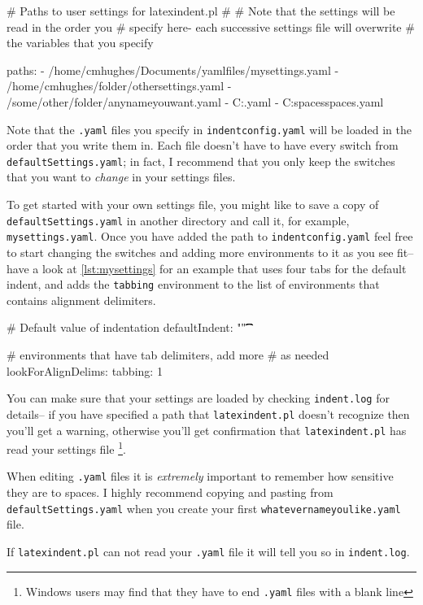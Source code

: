 \begin{yaml}[caption={\lstinline!indentconfig.yaml! (sample)},label={lst:indentconfig}]
# Paths to user settings for latexindent.pl
#
# Note that the settings will be read in the order you 
# specify here- each successive settings file will overwrite
# the variables that you specify

paths:
- /home/cmhughes/Documents/yamlfiles/mysettings.yaml
- /home/cmhughes/folder/othersettings.yaml
- /some/other/folder/anynameyouwant.yaml
- C:\Users\chughes\Documents\mysettings.yaml
- C:\Users\chughes\Desktop\test spaces\more spaces.yaml
\end{yaml}
 	 	 	 	 	
Note that the \lstinline!.yaml! files you specify in \lstinline!indentconfig.yaml!
will be loaded in the order that you write them in. Each file doesn't have 
to have every switch from \lstinline!defaultSettings.yaml!; in fact, I recommend 
that you only keep the switches that you want to \emph{change} in your 
settings files.
 	 	 	 	 	
To get started with your own settings file, you might like to save a copy of 
\lstinline!defaultSettings.yaml! in another directory and call it, for 
example, \lstinline!mysettings.yaml!. Once you have added the path to \lstinline!indentconfig.yaml!
feel free to start changing the switches and adding more environments to it 
as you see fit-- have a look at \cref{lst:mysettings} for an example 
that uses four tabs for the default indent, and adds the \lstinline!tabbing!
environment to the list of environments that contains alignment delimiters.
 	 	 	 	 	
\begin{yaml}[caption={\lstinline!mysettings.yaml! (example)},label={lst:mysettings}]
# Default value of indentation
defaultIndent: "\t\t\t\t"

# environments that have tab delimiters, add more 
# as needed
lookForAlignDelims:
   tabbing: 1
\end{yaml}
 	 	 	 	 	
You can make sure that your settings are loaded by checking \lstinline!indent.log!
for details-- if you have specified a path that \lstinline!latexindent.pl! doesn't 
recognize then you'll get a warning, otherwise you'll get confirmation that 
\lstinline!latexindent.pl! has read your settings file \footnote{Windows users 
	may find that they have to end \lstinline!.yaml! files with a blank line}.
 	 	 	 	 	
\begin{warning}
	When editing \lstinline!.yaml! files it is \emph{extremely} important 
	to remember how sensitive they are to spaces. I highly recommend copying 
	and pasting from \lstinline!defaultSettings.yaml! when you create your
	first \lstinline!whatevernameyoulike.yaml! file.
												
	If \lstinline!latexindent.pl! can not read your \lstinline!.yaml! file it 
	will tell you so in \lstinline!indent.log!.
\end{warning}
 	 	 	 	 	
